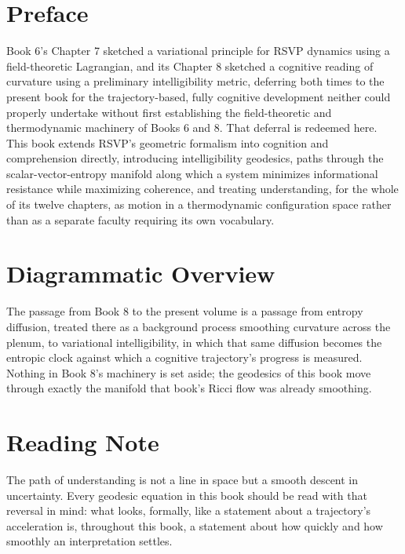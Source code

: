 \chapter*{Preface}

Book 6's Chapter 7 sketched a variational principle for RSVP dynamics using a field-theoretic Lagrangian, and its Chapter 8 sketched a cognitive reading of curvature using a preliminary intelligibility metric, deferring both times to the present book for the trajectory-based, fully cognitive development neither could properly undertake without first establishing the field-theoretic and thermodynamic machinery of Books 6 and 8. That deferral is redeemed here. This book extends RSVP's geometric formalism into cognition and comprehension directly, introducing intelligibility geodesics, paths through the scalar-vector-entropy manifold along which a system minimizes informational resistance while maximizing coherence, and treating understanding, for the whole of its twelve chapters, as motion in a thermodynamic configuration space rather than as a separate faculty requiring its own vocabulary.

\chapter*{Diagrammatic Overview}

The passage from Book 8 to the present volume is a passage from entropy diffusion, treated there as a background process smoothing curvature across the plenum, to variational intelligibility, in which that same diffusion becomes the entropic clock against which a cognitive trajectory's progress is measured. Nothing in Book 8's machinery is set aside; the geodesics of this book move through exactly the manifold that book's Ricci flow was already smoothing.

\chapter*{Reading Note}

The path of understanding is not a line in space but a smooth descent in uncertainty. Every geodesic equation in this book should be read with that reversal in mind: what looks, formally, like a statement about a trajectory's acceleration is, throughout this book, a statement about how quickly and how smoothly an interpretation settles.


